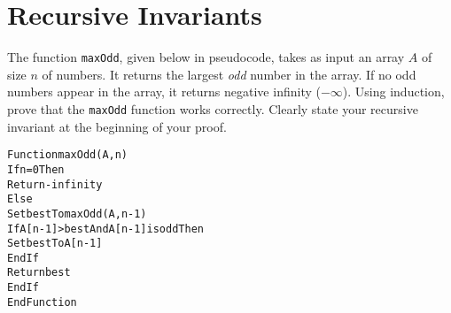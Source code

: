 \documentclass{article}
\begin{document}
    \vspace{1cm}
    \section{Recursive Invariants}
    
    The function \texttt{maxOdd}, given below in pseudocode, takes as 
    input an array $A$ of size $n$ of numbers.  It returns the largest 
    \emph{odd} number in the array.  If no odd numbers appear in the 
    array, it returns negative infinity ($-\infty$).  Using induction, 
    prove that the \texttt{maxOdd} function works correctly.  Clearly 
    state your recursive invariant at the beginning of your proof.

    \begin{alltt}
      Function maxOdd(A,n)
        If n = 0 Then
          Return -infinity
        Else
        Set best To maxOdd(A,n-1)
          If A[n-1] > best And A[n-1] is odd Then
            Set best To A[n-1]
          EndIf
          Return best
        EndIf
      EndFunction
    \end{alltt}
\end{document}
